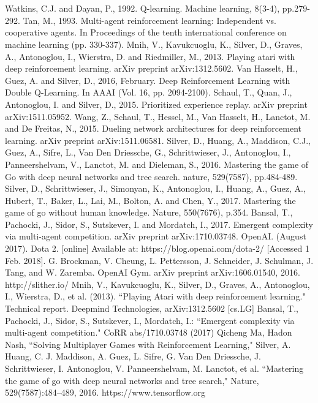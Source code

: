 \documentclass[conference]{IEEEtran}
\begin{document}
\section*{}

\begin{thebibliography}{00}
 Watkins, C.J. and Dayan, P., 1992. Q-learning. Machine learning, 8(3-4), pp.279-292.
 Tan, M., 1993. Multi-agent reinforcement learning: Independent vs. cooperative agents. In Proceedings of the tenth international conference on machine learning (pp. 330-337).
 Mnih, V., Kavukcuoglu, K., Silver, D., Graves, A., Antonoglou, I., Wierstra, D. and Riedmiller, M., 2013. Playing atari with deep reinforcement learning. arXiv preprint arXiv:1312.5602.
 Van Hasselt, H., Guez, A. and Silver, D., 2016, February. Deep Reinforcement Learning with Double Q-Learning. In AAAI (Vol. 16, pp. 2094-2100).
 Schaul, T., Quan, J., Antonoglou, I. and Silver, D., 2015. Prioritized experience replay. arXiv preprint arXiv:1511.05952.
 Wang, Z., Schaul, T., Hessel, M., Van Hasselt, H., Lanctot, M. and De Freitas, N., 2015. Dueling network architectures for deep reinforcement learning. arXiv preprint arXiv:1511.06581.
 Silver, D., Huang, A., Maddison, C.J., Guez, A., Sifre, L., Van Den Driessche, G., Schrittwieser, J., Antonoglou, I., Panneershelvam, V., Lanctot, M. and Dieleman, S., 2016. Mastering the game of Go with deep neural networks and tree search. nature, 529(7587), pp.484-489.
 Silver, D., Schrittwieser, J., Simonyan, K., Antonoglou, I., Huang, A., Guez, A., Hubert, T., Baker, L., Lai, M., Bolton, A. and Chen, Y., 2017. Mastering the game of go without human knowledge. Nature, 550(7676), p.354.
 Bansal, T., Pachocki, J., Sidor, S., Sutskever, I. and Mordatch, I., 2017. Emergent complexity via multi-agent competition. arXiv preprint arXiv:1710.03748.
 OpenAI. (August 2017). Dota 2. [online] Available at: https://blog.openai.com/dota-2/ [Accessed 1 Feb. 2018].
 G. Brockman, V. Cheung, L. Pettersson, J. Schneider, J. Schulman, J. Tang, and W. Zaremba. OpenAI
Gym. arXiv preprint arXiv:1606.01540, 2016.
 http://slither.io/
 Mnih, V., Kavukcuoglu, K., Silver, D., Graves, A., Antonoglou, I., Wierstra, D., et al. (2013). ``Playing Atari with deep reinforcement learning." Technical report. Deepmind Technologies, arXiv:1312.5602 [cs.LG]
 Bansal, T., Pachocki, J., Sidor, S., Sutskever, I., Mordatch, I.: ``Emergent complexity
via multi-agent competition." CoRR abs/1710.03748 (2017)
 Qicheng Ma, Hadon Nash, ``Solving Multiplayer Games with Reinforcement Learning,"
 Silver, A. Huang, C. J. Maddison, A. Guez, L. Sifre, G. Van Den Driessche, J. Schrittwieser, I. Antonoglou, V. Panneershelvam, M. Lanctot, et al. ``Mastering the game of go with deep neural networks and tree search," Nature, 529(7587):484–489, 2016.
https://www.tensorflow.org
\end{thebibliography}
\end{document}
